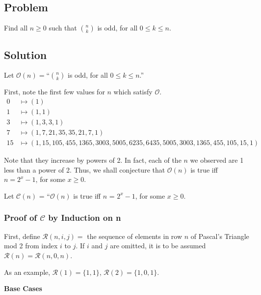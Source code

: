 \documentclass{article}
\newcommand{\pred}{\mathcal{O}}
\newcommand{\conject}{\mathcal{C}}
\newcommand{\modrow}{\mathcal{R}}
\begin{document}
\begin{center}\item \section*{Problem}\end{center}

Find all $n \geq 0$ such that ${n \choose k}$ is odd, for all $0\leq k \leq n$.

\begin{center}\item \section*{Solution}\end{center}

Let $\pred(n) = $``${n \choose k}$ is odd, for all $0 \leq k \leq n$.''

First, note the first few values for $n$ which satisfy $\pred$.
\begin{align*}
  0 &\mapsto (1)\\
  1 &\mapsto (1,1)\\
  3 &\mapsto (1,3,3,1)\\
  7 &\mapsto (1,7,21,35,35,21,7,1)\\
  15 &\mapsto (1,15,105,455,1365,3003,5005,6235,6435,5005,3003,1365,455,105,15,1)
\end{align*}


Note that they increase by powers of 2. In fact, each of the $n$ we observed are 1 less than a power of 2. Thus, we shall conjecture that $\pred(n)$ is true iff $n = 2^x-1$, for some $x \geq 0$.

Let $\conject(n)$ = ``$\pred(n)$ is true iff $n$ = $2^x-1$, for some $x\geq 0$.


\begin{center}\item \subsubsection*{Proof of $\conject$ by Induction on n}\end{center}

First, define $\modrow(n,i,j) = $ the sequence of elements in row $n$ of Pascal's Triangle mod 2 from index $i$ to $j$. If $i$ and $j$ are omitted, it is to be assumed $\modrow(n) = \modrow(n, 0, n)$.

As an example, $\modrow(1) = \{1,1\}$, $\modrow(2)= \{1,0,1\}$.
\begin{center}\item \textbf{Base Cases} \end{center}
\end{document}
